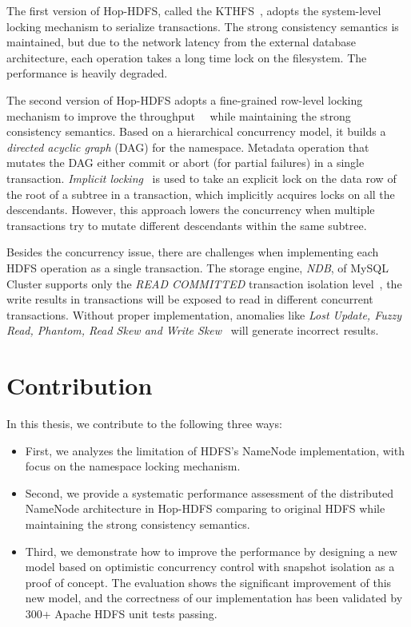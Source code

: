 \noindent The first version of Hop-HDFS, called the KTHFS~\cite{wasif2012distributed}, adopts the system-level locking mechanism to serialize transactions. The strong consistency semantics is maintained, but due to the network latency from the external database architecture, each operation takes a long time lock on the filesystem. The performance is heavily degraded.

\noindent The second version of Hop-HDFS adopts a fine-grained row-level locking mechanism to improve the throughput~\cite{hakimzadeh2014scaling}~\cite{peiro2013maintaining} while maintaining the strong consistency semantics. Based on a hierarchical concurrency model, it builds a \textit{directed acyclic graph} (DAG) for the namespace. Metadata operation that mutates the DAG either commit or abort (for partial failures) in a single transaction. \textit{Implicit locking}~\cite{gray1976granularity} is used to take an explicit lock on the data row of the root of a subtree in a transaction, which implicitly acquires locks on all the descendants. However, this approach lowers the concurrency when multiple transactions try to mutate different descendants within the same subtree.

\noindent Besides the concurrency issue, there are challenges when implementing each HDFS operation as a single transaction. The storage engine, \textit{NDB}, of MySQL Cluster supports only the \textit{READ COMMITTED} transaction isolation level~\cite{ndblimits}, the write results in transactions will be exposed to read in different concurrent transactions. Without proper implementation, anomalies like \textit{Lost Update, Fuzzy Read, Phantom, Read Skew and Write Skew}~\cite{berenson1995critique} will generate incorrect results.


\section{Contribution}

In this thesis, we contribute to the following three ways:

\begin{itemize}[noitemsep]
	\item First, we analyzes the limitation of HDFS's NameNode implementation, with focus on the namespace locking mechanism.
	\item Second, we provide a systematic performance assessment of the distributed NameNode architecture in Hop-HDFS comparing to original HDFS while maintaining the strong consistency semantics.
	\item Third, we demonstrate how to improve the performance by designing a new model based on optimistic concurrency control with snapshot isolation as a proof of concept. The evaluation shows the significant improvement of this new model, and the correctness of our implementation has been validated by 300+ Apache HDFS unit tests passing.
\end{itemize}

